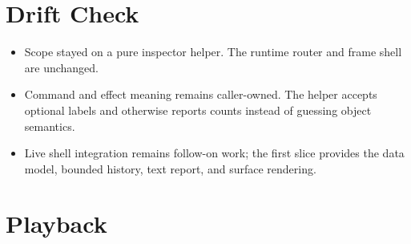 \section{Drift Check}\label{record-123-drift-check}

\begin{itemize}
\tightlist
\item
  Scope stayed on a pure inspector helper. The runtime router and frame shell are unchanged.
\item
  Command and effect meaning remains caller-owned. The helper accepts optional labels and otherwise reports counts instead of guessing object semantics.
\item
  Live shell integration remains follow-on work; the first slice provides the data model, bounded history, text report, and surface rendering.
\end{itemize}

\section{Playback}\label{record-123-playback}

